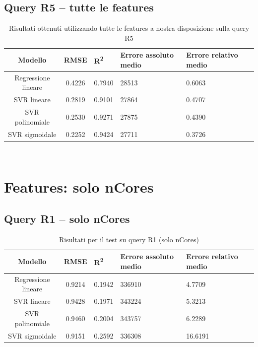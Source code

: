 \documentclass[a4paper,11pt]{article}
\begin{document}
\subsection{Query R5 -- tutte le features}
\begin{table}[H]
	\centering
	\begin{adjustbox}{center}
		\begin{tabular}{c | c M{1.2cm} M{2.5cm} M{2.5cm} M{1.8cm}}
			Modello & RMSE & R\textsuperscript{2} & Errore assoluto medio & Errore relativo medio \tabularnewline
			\hline
			Regressione lineare & 0.4226 & 0.7940 &  28513 & 0.6063 \\
			SVR lineare & 0.2819 & 0.9101 &  27864 & 0.4707 \\
			SVR polinomiale & 0.2530 & 0.9271 &  27875 & 0.4390 \\
			SVR sigmoidale & 0.2252 & 0.9424 &  27711 & 0.3726 \\
		\end{tabular}
	\end{adjustbox}
	\\
	\caption{Risultati ottenuti utilizzando tutte le features a nostra disposizione sulla query R5}
	\label{table_all_features_all_R5}
\end{table}

\newpage
\section{Features: solo nCores}
\subsection{Query R1 -- solo nCores}
\begin{table}[bhpt]
	\centering
	\begin{adjustbox}{center}
		\begin{tabular}{c | c M{1.2cm} M{2.5cm} M{2.5cm} M{1.8cm}}
			Modello & RMSE & R\textsuperscript{2} & Errore assoluto medio & Errore relativo medio \tabularnewline
			\hline
			Regressione lineare & 0.9214 & 0.1942 & 336910 & 4.7709 \\
			SVR lineare & 0.9428 & 0.1971 & 343224 & 5.3213 \\
			SVR polinomiale & 0.9460 & 0.2004 & 343757 & 6.2289 \\
			SVR sigmoidale & 0.9151 & 0.2592 & 336308 & 16.6191 \\
		\end{tabular}
	\end{adjustbox}
	\\
	\caption{Risultati per il test su query R1 
(solo nCores)}
	\label{table_R1_nCores}
\end{table}
\end{document}
